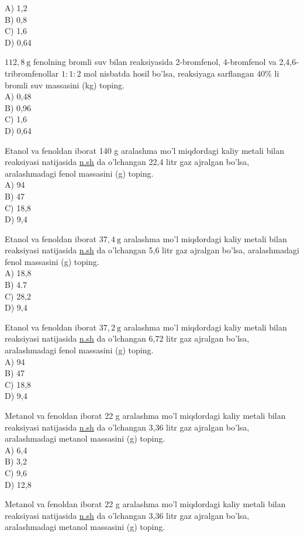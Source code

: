A) 1,2\\
B) 0,8\\
C) 1,6\\
D) 0,64
  \item $112,8 \mathrm{~g}$ fenolning bromli suv bilan reaksiyasida 2-bromfenol, 4-bromfenol va 2,4,6-tribromfenollar $1: 1: 2$ mol nisbatda hosil bo'lsa, reaksiyaga sarflangan $40 \%$ li bromli suv massasini (kg) toping.\\
A) 0,48\\
B) 0,96\\
C) 1,6\\
D) 0,64
  \item Etanol va fenoldan iborat 140 g aralashma mo'l miqdordagi kaliy metali bilan reaksiyasi natijasida \href{http://n.sh}{n.sh} da o'lchangan 22,4 litr gaz ajralgan bo'lsa, aralashmadagi fenol massasini (g) toping.\\
A) 94\\
B) 47\\
C) 18,8\\
D) 9,4
  \item Etanol va fenoldan iborat $37,4 \mathrm{~g}$ aralashma mo'l miqdordagi kaliy metali bilan reaksiyasi natijasida \href{http://n.sh}{n.sh} da o'lchangan 5,6 litr gaz ajralgan bo'lsa, aralashmadagi fenol massasini (g) toping.\\
A) 18,8\\
B) 4.7\\
C) 28,2\\
D) 9,4
  \item Etanol va fenoldan iborat $37,2 \mathrm{~g}$ aralashma mo'l miqdordagi kaliy metali bilan reaksiyasi natijasida \href{http://n.sh}{n.sh} da o'lchangan 6,72 litr gaz ajralgan bo'lsa, aralashmadagi fenol massasini (g) toping.\\
A) 94\\
B) 47\\
C) 18,8\\
D) 9,4
  \item Metanol va fenoldan iborat 22 g aralashma mo'l miqdordagi kaliy metali bilan reaksiyasi natijasida \href{http://n.sh}{n.sh} da o'lchangan 3,36 litr gaz ajralgan bo'lsa, aralashmadagi metanol massasini (g) toping.\\
A) 6,4\\
B) 3,2\\
C) 9,6\\
D) 12,8
  \item Metanol va fenoldan iborat 22 g aralashma mo'l miqdordagi kaliy metali bilan reaksiyasi natijasida \href{http://n.sh}{n.sh} da o'lchangan 3,36 litr gaz ajralgan bo'lsa, aralashmadagi metanol massasini (g) toping.\\
